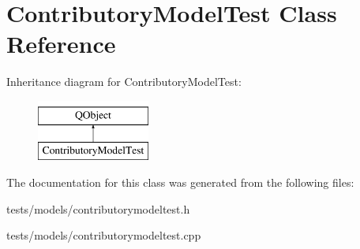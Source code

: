 \hypertarget{classContributoryModelTest}{}\section{Contributory\+Model\+Test Class Reference}
\label{classContributoryModelTest}
Inheritance diagram for Contributory\+Model\+Test\+:\begin{figure}[H]
\begin{center}
\leavevmode
\includegraphics[height=2.000000cm]{d5/d97/classContributoryModelTest}
\end{center}
\end{figure}


The documentation for this class was generated from the following files\+:\begin{DoxyCompactItemize}
\item 
tests/models/contributorymodeltest.\+h\item 
tests/models/contributorymodeltest.\+cpp\end{DoxyCompactItemize}
